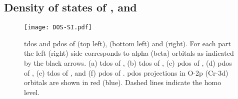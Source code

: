 \begin{refsection}
\newpage
\section{Density of states of ,  and  }

\begin{figure}[ht]
    \centering
	\texttt{[image: DOS-SI.pdf]}
	\caption{\acrshort{tdos} and \acrshort{pdos} of  (top left),  (bottom left) and  (right). For each part the left (right) side corresponds to alpha (beta) orbitals as indicated by the black arrows. (a) \acrshort{tdos} of , (b) \acrshort{tdos} of , (c) \acrshort{pdos} of , (d) \acrshort{pdos} of , (e) \acrshort{tdos} of , and (f) \acrshort{pdos} of . \acrshort{pdos} projections in O-2p (Cr-3d) orbitals are shown in red (blue). Dashed lines indicate the \acrshort{homo} level.} 
	\label{a7fig:dos}
\end{figure}




















\cleardoublepage

\printbibliography[heading=subbibliography] %

\end{refsection}


